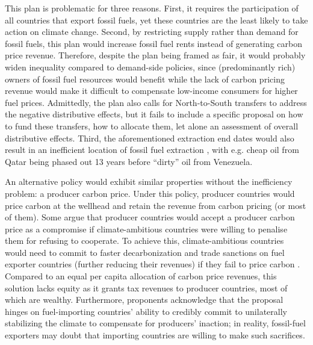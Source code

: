 \documentclass[12pt,english]{article}
\begin{document}
This plan is problematic for three reasons. First, it requires the participation of all countries that export fossil fuels, yet these countries are the least likely to take action on climate change. Second, by restricting supply rather than demand for fossil fuels, this plan would increase fossil fuel rents instead of generating carbon price revenue. Therefore, despite the plan being framed as fair, it would probably widen inequality compared to demand-side policies, since (predominantly rich) owners of fossil fuel resources would benefit while the lack of carbon pricing revenue would make it difficult to compensate low-income consumers for higher fuel prices. Admittedly, the plan also calls for North-to-South transfers to address the negative distributive effects, but it fails to include a specific proposal on how to fund these transfers, how to allocate them, let alone an assessment of overall distributive effects. 
Third, the aforementioned extraction end dates would also result in an inefficient location of fossil fuel extraction \citep{coulomb_bad_2025}, with e.g. cheap oil from Qatar being phased out 13 years before ``dirty'' oil from Venezuela. 

An alternative policy would exhibit similar properties without the inefficiency problem: a producer carbon price. Under this policy, producer countries would price carbon at the wellhead and retain the revenue from carbon pricing (or most of them). Some argue that producer countries would accept a producer carbon price as a compromise if climate-ambitious countries were willing to penalise them for refusing to cooperate. To achieve this, climate-ambitious countries would need to commit to faster decarbonization and trade sanctions on fuel exporter countries (further reducing their revenues) if they fail to price carbon \citep{peszko_cooperative_2019}. Compared to an equal per capita allocation of carbon price revenues, this solution lacks equity as it grants tax revenues to producer countries, most of which are wealthy. Furthermore, proponents acknowledge that the proposal hinges on fuel-importing countries' ability to credibly commit to unilaterally stabilizing the climate to compensate for producers' inaction; %
in reality, fossil-fuel exporters may doubt that importing countries are willing to make such sacrifices.

\end{document}
